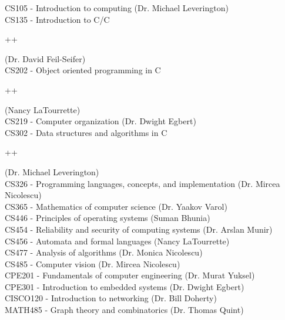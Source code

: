 \documentclass[8pt]{paper}
\begin{document}
\begin{flushleft}
CS105 \hspace{6mm} - Introduction to computing (Dr. Michael Leverington)\\
CS135 \hspace{6mm} - Introduction to C/C\begin{small}++\end{small} (Dr. David Feil-Seifer)\\
CS202 \hspace{6mm} - Object oriented programming in C\begin{small}++\end{small} (Nancy LaTourrette)\\
CS219 \hspace{6mm} - Computer organization (Dr. Dwight Egbert)\\
CS302 \hspace{6mm} - Data structures and algorithms in C\begin{small}++\end{small} (Dr. Michael Leverington)\\
CS326 \hspace{6mm} - Programming languages, concepts, and implementation (Dr. Mircea Nicolescu)\\
CS365 \hspace{6mm} - Mathematics of computer science (Dr. Yaakov Varol)\\	
CS446 \hspace{6mm} - Principles of operating systems (Suman Bhunia)\\	
CS454 \hspace{6mm} - Reliability and security of computing systems (Dr. Arslan Munir)\\
CS456 \hspace{6mm} - Automata and formal languages (Nancy LaTourrette)\\
CS477 \hspace{6mm} - Analysis of algorithms (Dr. Monica Nicolescu)\\
CS485 \hspace{6mm} - Computer vision (Dr. Mircea Nicolescu)\\
CPE201 \hspace{2.75mm} - Fundamentals of computer engineering (Dr. Murat Yuksel)\\
CPE301 \hspace{2.75mm} - Introduction to embedded systems (Dr. Dwight Egbert)\\
CISCO120 - Introduction to networking (Dr. Bill Doherty)\\
MATH485 - Graph theory and combinatorics (Dr. Thomas Quint)\\
	

\end{flushleft}
\end{document}
